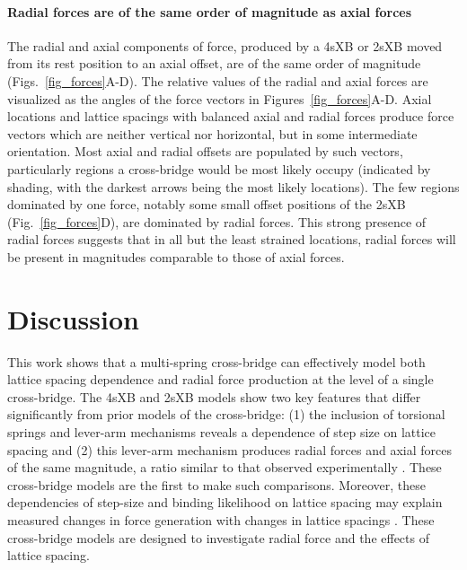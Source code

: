 \documentclass[]{article}
\begin{document}
\paragraph{Radial forces are of the same order of magnitude as axial forces} %
The radial and axial components of force, produced by a 4sXB or 2sXB moved from its rest position to an axial offset, are of the same order of magnitude (Figs.~\ref{fig_forces}A-D). 
The relative values of the radial and axial forces are visualized as the angles of the force vectors in Figures~\ref{fig_forces}A-D. 
Axial locations and lattice spacings with balanced axial and radial forces produce force vectors which are neither vertical nor horizontal, but in some intermediate orientation.
Most axial and radial offsets are populated by such vectors, particularly regions a cross-bridge would be most likely occupy (indicated by shading, with the darkest arrows being the most likely locations). 
The few regions dominated by one force, notably some small offset positions of the 2sXB (Fig.~\ref{fig_forces}D), are dominated by radial forces.
This strong presence of radial forces suggests that in all but the least strained locations, radial forces will be present in magnitudes comparable to those of axial forces. 



\section*{Discussion} %

This work shows that a multi-spring cross-bridge can effectively model both lattice spacing dependence and radial force production at the level of a single cross-bridge. 
The 4sXB and 2sXB models show two key features that differ significantly from prior models of the cross-bridge: (1) the inclusion of torsional springs and lever-arm mechanisms reveals a dependence of step size on lattice spacing and (2) this lever-arm mechanism produces radial forces and axial forces of the same magnitude, a ratio similar to that observed experimentally \citep{Cecchi1990, Brenner1991}. 
These cross-bridge models are the first to make such comparisons.
Moreover, these dependencies of step-size and binding likelihood on lattice spacing may explain measured changes in force generation with changes in lattice spacings  \citep{Millman1998}. 
These cross-bridge models are designed to investigate radial force and the effects of lattice spacing. 
\end{document}
